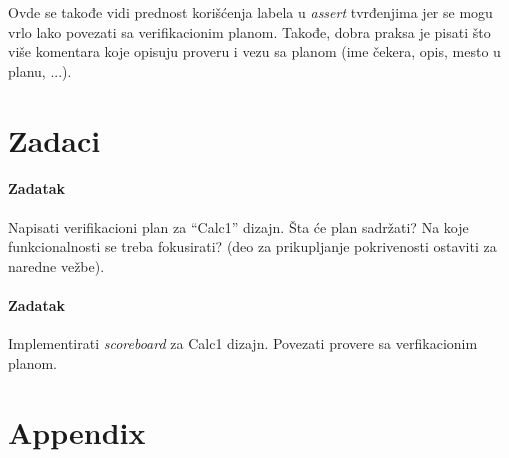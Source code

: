 Ovde se takođe vidi prednost korišćenja labela u \emph{assert} tvrđenjima jer
se mogu vrlo lako povezati sa verifikacionim planom. Takođe, dobra praksa je
pisati što više komentara koje opisuju proveru i vezu sa planom (ime čekera,
opis, mesto u planu, ...).


\section{Zadaci}

\paragraph{Zadatak}

Napisati verifikacioni plan za ``Calc1'' dizajn. Šta će plan sadržati? Na koje
funkcionalnosti se treba fokusirati? (deo za prikupljanje pokrivenosti ostaviti
za naredne vežbe).

\paragraph{Zadatak}

Implementirati \emph{scoreboard} za Calc1 dizajn. Povezati provere sa
verfikacionim planom.


\section{Appendix}





